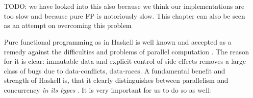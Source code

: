 \chapter*{} %
\label{ch:parallel_abs}
TODO: we have looked into this also because we think our implementations are too slow and because pure FP is notoriously slow. This chapter can also be seen as an attempt on overcoming this problem 

Pure functional programming as in Haskell is well known and accepted as a remedy against the difficulties and problems of parallel computation \cite{hudak_history_2007}. The reason for it is clear: immutable data and explicit control of side-effects removes a large class of bugs due to data-conflicts, data-races. A fundamental benefit and strength of Haskell is, that it clearly distinguishes between parallelism and concurrency \textit{in its types} \cite{jones_tackling_2002}. It is very important for us to do so as well:


